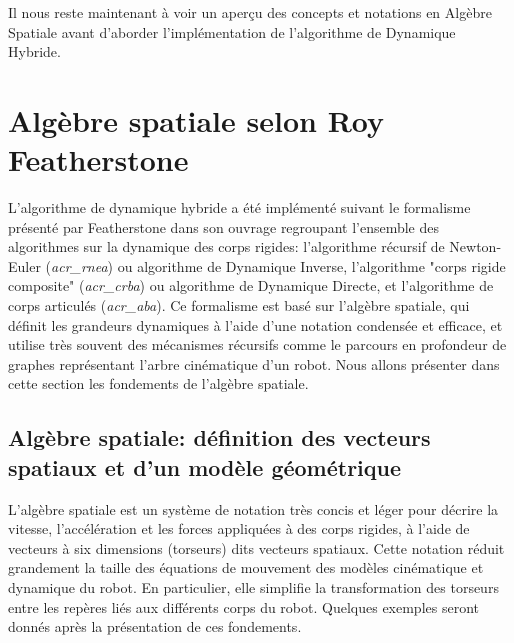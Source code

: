 \documentclass{report}
\begin{document}
Il nous reste maintenant à voir un aperçu des concepts et notations en Algèbre Spatiale avant d'aborder l'implémentation de l'algorithme de Dynamique Hybride.



\chapter{Algèbre spatiale selon Roy Featherstone}


L'algorithme de dynamique hybride a été implémenté suivant le formalisme présenté par Featherstone dans son ouvrage \cite{bib_featherstone} regroupant l'ensemble des algorithmes sur la dynamique des corps rigides: l'algorithme récursif de Newton-Euler (\emph{\gls{acr_rnea}}) ou algorithme de Dynamique Inverse, l'algorithme "corps rigide composite" (\emph{\gls{acr_crba}}) ou algorithme de Dynamique Directe, et l'algorithme de corps articulés (\emph{\gls{acr_aba}}). Ce formalisme est basé sur l'algèbre spatiale, qui définit les grandeurs dynamiques à l'aide d'une notation condensée et efficace, et utilise très souvent des mécanismes récursifs comme le parcours en profondeur de graphes représentant l'arbre cinématique d'un robot. Nous allons présenter dans cette section les fondements de l'algèbre spatiale.\\


\section{Algèbre spatiale: définition des vecteurs spatiaux et d'un modèle géométrique}

L'algèbre spatiale est un système de notation très concis et léger pour décrire la vitesse, l'accélération et les forces appliquées à des corps rigides, à l'aide de vecteurs à six dimensions (torseurs) dits vecteurs spatiaux. Cette notation réduit grandement la taille des équations de mouvement des modèles cinématique et dynamique du robot. En particulier, elle simplifie la transformation des torseurs entre les repères liés aux différents corps du robot. Quelques exemples seront donnés après la présentation de ces fondements.\\
\end{document}
